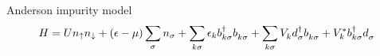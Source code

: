 \documentclass[aspectratio=169]{beamer}
\begin{document}
\begin{frame}{Anderson impurity model}
    \begin{equation}
        H
        =
        U n_\uparrow n_\downarrow
        + (\epsilon - \mu) \sum_\sigma n_\sigma
        + \sum_{k\sigma} \epsilon_k b^\dag_{k\sigma} b^{\pdag}_{k\sigma}
        + \sum_{k\sigma} V^{\ps}_k d^\dag_{\pk\sigma} b^{\pdag}_{k\sigma}
        + V_k^* b^\dag_{k\sigma} d^{\pdag}_{\pk\sigma}
    \end{equation}
    \begin{center}
        
    \end{center}
\end{frame}
\end{document}
